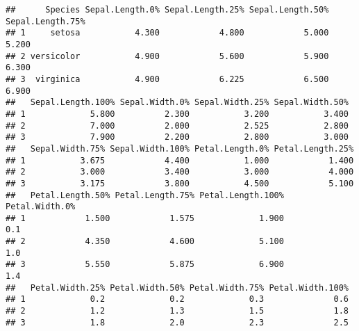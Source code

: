 \documentclass[
]{article}
\newenvironment{Shaded}{\begin{snugshade}}{\end{snugshade}}
\newcommand{\AttributeTok}[1]{\textcolor[rgb]{0.13,0.29,0.53}{#1}}
\newcommand{\CommentTok}[1]{\textcolor[rgb]{0.56,0.35,0.01}{\textit{#1}}}
\newcommand{\DecValTok}[1]{\textcolor[rgb]{0.00,0.00,0.81}{#1}}
\newcommand{\FunctionTok}[1]{\textcolor[rgb]{0.13,0.29,0.53}{\textbf{#1}}}
\newcommand{\NormalTok}[1]{#1}
\newcommand{\SpecialCharTok}[1]{\textcolor[rgb]{0.81,0.36,0.00}{\textbf{#1}}}
\begin{document}
\begin{verbatim}
##      Species Sepal.Length.0% Sepal.Length.25% Sepal.Length.50% Sepal.Length.75%
## 1     setosa           4.300            4.800            5.000            5.200
## 2 versicolor           4.900            5.600            5.900            6.300
## 3  virginica           4.900            6.225            6.500            6.900
##   Sepal.Length.100% Sepal.Width.0% Sepal.Width.25% Sepal.Width.50%
## 1             5.800          2.300           3.200           3.400
## 2             7.000          2.000           2.525           2.800
## 3             7.900          2.200           2.800           3.000
##   Sepal.Width.75% Sepal.Width.100% Petal.Length.0% Petal.Length.25%
## 1           3.675            4.400           1.000            1.400
## 2           3.000            3.400           3.000            4.000
## 3           3.175            3.800           4.500            5.100
##   Petal.Length.50% Petal.Length.75% Petal.Length.100% Petal.Width.0%
## 1            1.500            1.575             1.900            0.1
## 2            4.350            4.600             5.100            1.0
## 3            5.550            5.875             6.900            1.4
##   Petal.Width.25% Petal.Width.50% Petal.Width.75% Petal.Width.100%
## 1             0.2             0.2             0.3              0.6
## 2             1.2             1.3             1.5              1.8
## 3             1.8             2.0             2.3              2.5
\end{verbatim}

\begin{Shaded}
\end{Shaded}
\end{document}
